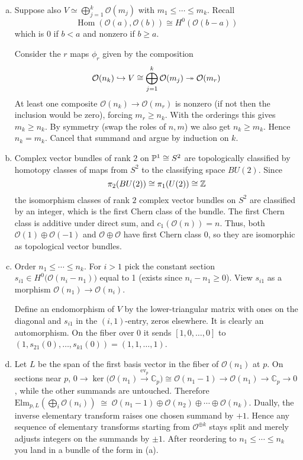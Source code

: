 \documentclass[12pt]{article}  %
\begin{document}
\begin{solution}
    \begin{enumerate}[(a)]
        \item Suppose also $V\simeq \bigoplus_{j=1}^k \mathcal O(m_j)$ with $m_1\le\cdots\le m_k$. Recall \[\operatorname{Hom}(\mathcal O(a),\mathcal O(b)) \cong H^0(\mathcal O(b-a))\] which is $0$ if $b<a$ and nonzero if $b\ge a$.

        Consider the $r$ maps $\phi_r$ given by the composition
        \begin{align*}
            \cO(n_k) \hookrightarrow V \cong \bigoplus_{j=1}^k \cO(m_j) \twoheadrightarrow \cO(m_r)
        \end{align*}
        At least one composite
        $\mathcal O(n_k)\to \mathcal O(m_r)$ is nonzero (if not then the inclusion would be zero), forcing $m_r\ge n_k$. With the orderings this gives $m_k\ge n_k$. By symmetry (swap the roles of $n,m$) we also get $n_k\ge m_k$. Hence $n_k=m_k$. Cancel that summand and argue by induction on $k$. 
        \item Complex vector bundles of rank $2$ on $\P^1\cong S^2$ are topologically classified by homotopy classes of maps from $S^2$ to the classifying space $BU(2)$. Since \[\pi_2(BU(2))\cong \pi_1(U(2))\cong \Z\] the isomorphism classes of rank $2$ complex vector bundles on $S^2$ are classified by an integer, which is the first Chern class of the bundle. The first Chern class is additive under direct sum, and $c_1(\mathcal O(n)) = n$. Thus, both $\mathcal O(1)\oplus \mathcal O(-1)$ and $\mathcal O\oplus \mathcal O$ have first Chern class $0$, so they are isomorphic as topological vector bundles.
        \item Order $n_1\le\cdots\le n_k$. For $i>1$ pick the constant section $s_{i1}\in H^0\!\big(\mathcal O(n_i-n_1)\big)$ equal to 1 (exists since $n_i-n_1\ge 0$). View $s_{i1}$ as a morphism $\mathcal O(n_1)\to \mathcal O(n_i)$.

        Define an endomorphism of $V$ by the lower-triangular matrix with ones on the diagonal and $s_{i1}$ in the $(i,1)$-entry, zeros elsewhere. It is clearly an automorphism. On the fiber over 0 it sends $[1,0,\dots,0]$ to $(1,s_{21}(0),\dots,s_{k1}(0))=(1,1,\dots,1)$.
        \item Let $L$ be the span of the first basis vector in the fiber of $\mathcal O(n_1)$ at $p$. On sections near $p$,
        $0\to \ker\big(\mathcal O(n_1)\xrightarrow{\mathrm{ev}_p}\mathbb C_p\big)\cong \mathcal O(n_1-1)\to \mathcal O(n_1)\to \mathbb C_p\to 0$,
        while the other summands are untouched. Therefore
        $\mathrm{Elm}_{p,L}\!\left(\bigoplus_i \mathcal O(n_i)\right)\;\cong\; \mathcal O(n_1-1)\oplus \mathcal O(n_2)\oplus\cdots\oplus \mathcal O(n_k)$. Dually, the inverse elementary transform raises one chosen summand by $+1$.
        Hence any sequence of elementary transforms starting from $\mathcal O^{\oplus k}$ stays split and merely adjusts integers on the summands by $\pm1$. After reordering to $n_1\le\cdots\le n_k$ you land in a bundle of the form in (a).

    \end{enumerate}
\end{solution}
\end{document}
